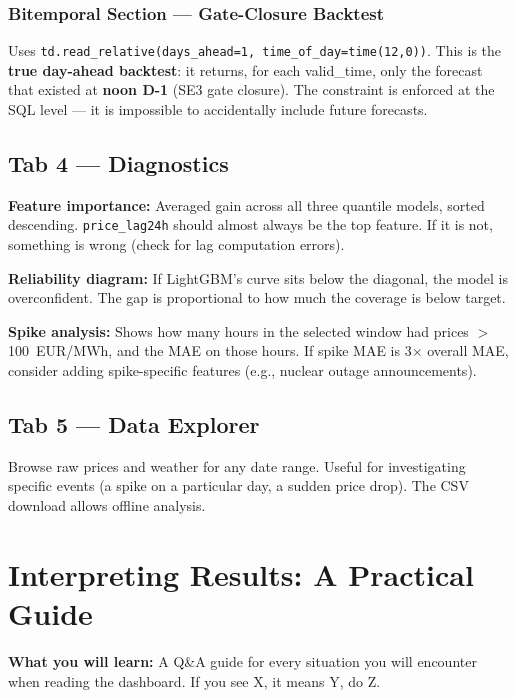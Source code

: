 \documentclass[12pt, a4paper, oneside]{memoir}
\newcommand{\EUR}{EUR/MWh}
\newcommand{\code}[1]{\texttt{\footnotesize #1}}
\begin{document}
\subsection{Bitemporal Section --- Gate-Closure Backtest}

Uses \code{td.read\_relative(days\_ahead=1, time\_of\_day=time(12,0))}. This is the
\textbf{true day-ahead backtest}: it returns, for each valid\_time, only the forecast
that existed at \textbf{noon D-1} (SE3 gate closure). The constraint is enforced at
the SQL level --- it is impossible to accidentally include future forecasts.

\section{Tab 4 --- Diagnostics}

\textbf{Feature importance:} Averaged gain across all three quantile models, sorted
descending. \code{price\_lag24h} should almost always be the top feature. If it is not,
something is wrong (check for lag computation errors).

\textbf{Reliability diagram:} If LightGBM's curve sits below the diagonal, the model
is overconfident. The gap is proportional to how much the coverage is below target.

\textbf{Spike analysis:} Shows how many hours in the selected window had prices
$>$100~\EUR{}, and the MAE on those hours. If spike MAE is 3$\times$ overall MAE,
consider adding spike-specific features (e.g., nuclear outage announcements).

\section{Tab 5 --- Data Explorer}

Browse raw prices and weather for any date range. Useful for investigating specific
events (a spike on a particular day, a sudden price drop). The CSV download allows
offline analysis.

\chapter{Interpreting Results: A Practical Guide}\label{ch:interpret}

\begin{chapterintro}
\sffamily\small\textbf{What you will learn:} A Q\&A guide for every situation you
will encounter when reading the dashboard. If you see X, it means Y, do Z.
\end{chapterintro}
\end{document}
